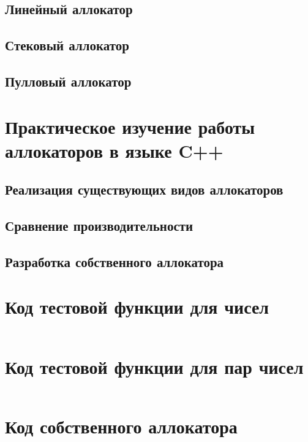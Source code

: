 \documentclass[coursework]{SCWorks}
\begin{document}
\subsection*{Линейный аллокатор}
	

\subsection*{Стековый аллокатор}


\subsection*{Пулловый аллокатор}



\section{Практическое изучение работы аллокаторов в языке C++}

\subsection{Реализация существующих видов аллокаторов}


\subsection{Сравнение производительности}


\subsection{Разработка собственного аллокатора}


\conclusion






\appendix

\section{Код тестовой функции для чисел}
\small
\inputminted{cpp}{src/test.cpp}
\normalsize

\section{Код тестовой функции для пар чисел}
\small
\inputminted{cpp}{src/test_pairs.cpp}
\normalsize

\section{Код собственного аллокатора}
\small
\inputminted{cpp}{src/column_allocator.h}
\normalsize
\end{document}
